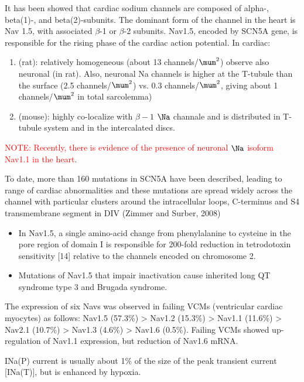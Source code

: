 It has been showed that cardiac sodium channels are composed of alpha-,
beta(1)-, and beta(2)-subunits. The dominant form of the channel in the heart is
Nav 1.5, with associated $\beta$-1 or $\beta$-2 subunits.
Nav1.5, encoded by SCN5A gene, is responsible for the rising phase of the
cardiac action potential. In cardiac:
  \begin{enumerate}
	\item \citep{brette2006} (rat): relatively homogeneous (about 13
	channels/$\mum^2$) observe also neuronal (in rat). Also, neuronal Na channels
	is higher at the T-tubule than the surface (2.5  channels/$\mum^2$) vs. 0.3
	channels/$\mum^2$, giving about 1 channels/$\mum^2$ in total sarcolemma)
	
	\item \citep{dominguez2008} (mouse): highly co-localize with
	$\beta-1$ $\Na$ channale and is distributed in T-tubule system and in the
	intercalated discs.
  \end{enumerate}
\textcolor{red}{NOTE: Recently, there is evidence of the presence of neuronal
$\Na$ isoform Nav1.1 in the heart}. 

To date, more than 160 mutations in SCN5A have been described, leading to range
of cardiac abnormalities and these mutations are spread widely across the
channel with particular clusters around the intracellular loops, C-terminus and
S4 transmembrane segment in DIV (Zimmer and Surber, 2008)
\begin{itemize}
  \item  In Nav1.5, a single amino-acid change from phenylalanine to cysteine in the
pore region of domain I is responsible for 200-fold reduction in tetrodotoxin
sensitivity [14] relative to the channels encoded on chromosome 2.
  
  \item Mutations of Nav1.5 that impair inactivation cause inherited long QT syndrome
type 3 and Brugada syndrome.
  
\end{itemize}
The expression of six Navs was observed in failing VCMs (ventricular cardiac
myocytes) as follows: Nav1.5 (57.3\%) > Nav1.2 (15.3\%) > Nav1.1 (11.6\%) >
Nav2.1 (10.7\%) > Nav1.3 (4.6\%) > Nav1.6 (0.5\%).
Failing VCMs showed up-regulation of Nav1.1 expression, but reduction of Nav1.6
mRNA.

INa(P) current is usually about 1\% of the size of the peak transient current
[INa(T)], but is enhanced by hypoxia.


  
